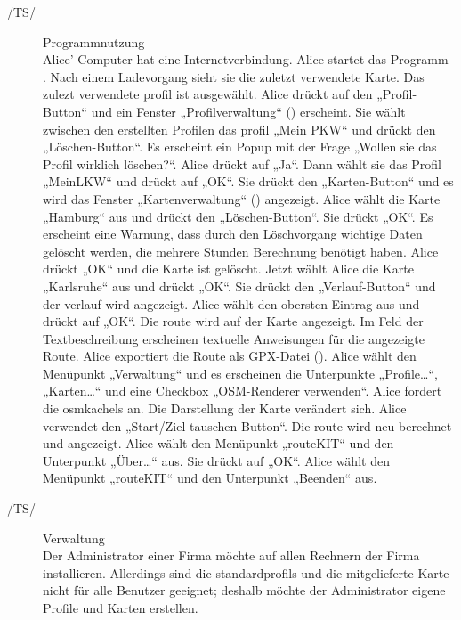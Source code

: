 \documentclass[a4paper, 11pt]{article}
\makeatletter
\def\namedlabel#1#2{\begingroup
    #2%
    \def\@currentlabel{#2}%
    \phantomsection\label{#1}\endgroup
}
\newcommand{\oitem}[2]{
  \@ifundefined{c@oitem#1}{\newcounter{oitem#1}}{} %
  \addtocounter{oitem#1}{10}
  \item[\namedlabel{#1:#2}{/#1\arabic{oitem#1}/}]
}
\makeatother
\begin{document}
\begin{description}
\oitem{TS}{programmnutzung} Programmnutzung\\
Alice’ Computer hat eine Internetverbindung. Alice startet das Programm \routeKIT. Nach einem Ladevorgang sieht sie die zuletzt verwendete Karte. Das zulezt verwendete \gls{profil} ist ausgewählt. Alice drückt auf den „Profil-Button“ und ein Fenster „Profilverwaltung“  () erscheint. Sie wählt zwischen den erstellten Profilen das \gls{profil} „Mein PKW“ und drückt den „Löschen-Button“. Es erscheint ein Popup mit der Frage „Wollen sie das Profil wirklich löschen?“. Alice drückt auf „Ja“. Dann wählt sie das Profil „MeinLKW“ und drückt auf „OK“. Sie drückt den „Karten-Button“ und es wird das Fenster „Kartenverwaltung“ () angezeigt. Alice wählt die Karte „Hamburg“ aus und drückt den „Löschen-Button“. Sie drückt „OK“. Es erscheint eine Warnung, dass durch den Löschvorgang wichtige Daten gelöscht werden, die mehrere Stunden Berechnung benötigt haben. Alice drückt „OK“ und die Karte ist gelöscht. Jetzt wählt Alice die Karte „Karlsruhe“ aus und drückt „OK“. Sie drückt den „Verlauf-Button“ und der \gls{verlauf} wird angezeigt. Alice wählt den obersten Eintrag aus und drückt auf „OK“. Die \gls{route} wird auf der Karte angezeigt. Im Feld der Textbeschreibung erscheinen textuelle Anweisungen für die angezeigte Route. Alice exportiert die Route als GPX-Datei (). Alice wählt den Menüpunkt „Verwaltung“ und es erscheinen die Unterpunkte „Profile\ldots“, „Karten\ldots“ und  eine Checkbox „OSM-Renderer verwenden“. Alice fordert die \glspl{osmkachel} an. Die Darstellung der Karte verändert sich. Alice verwendet den „Start/Ziel-tauschen-Button“. Die \gls{route} wird neu berechnet und angezeigt. Alice wählt den Menüpunkt „routeKIT“ und den Unterpunkt „Über\ldots“ aus. Sie drückt auf „OK“. Alice wählt den Menüpunkt „routeKIT“ und den Unterpunkt „Beenden“ aus.

\oitem{TS}{verwaltung} Verwaltung\\
Der Administrator einer Firma möchte \routeKIT auf allen Rechnern der Firma installieren. Allerdings sind die \glspl{standardprofil} und die mitgelieferte Karte nicht für alle Benutzer geeignet; deshalb möchte der Administrator eigene Profile und Karten erstellen.


\end{description}
\end{document}
